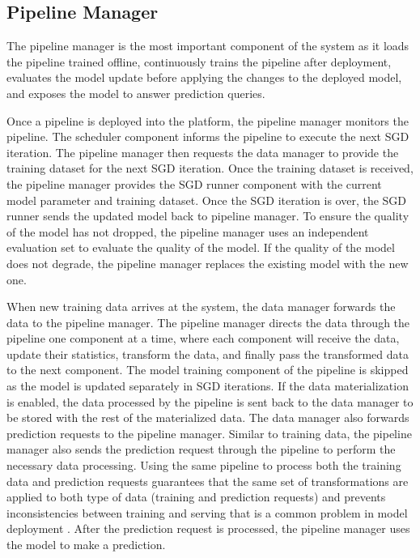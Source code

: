 \subsection{Pipeline Manager} \label{pipeline-manager} 
The pipeline manager is the most important component of the system as it loads the pipeline trained offline, continuously trains the pipeline after deployment, evaluates the model update before applying the changes to the deployed model, and exposes the model to answer prediction queries.

Once a pipeline is deployed into the platform, the pipeline manager monitors the pipeline.
The scheduler component informs the pipeline to execute the next SGD iteration.
The pipeline manager then requests the data manager to provide the training dataset for the next SGD iteration.
Once the training dataset is received, the pipeline manager provides the SGD runner component with the current model parameter and training dataset.
Once the SGD iteration is over, the SGD runner sends the updated model back to pipeline manager.
To ensure the quality of the model has not dropped, the pipeline manager uses an independent evaluation set to evaluate the quality of the model.
If the quality of the model does not degrade, the pipeline manager replaces the existing model with the new one.

When new training data arrives at the system, the data manager forwards the data to the pipeline manager. 
The pipeline manager directs the data through the pipeline one component at a time, where each component will receive the data, update their statistics, transform the data, and finally pass the transformed data to the next component.
The model training component of the pipeline is skipped as the model is updated separately in SGD iterations.
If the data materialization is enabled, the data processed by the pipeline is sent back to the data manager to be stored with the rest of the materialized data.
The data manager also forwards prediction requests to the pipeline manager.
Similar to training data, the pipeline manager also sends the prediction request through the pipeline to perform the necessary data processing.
Using the same pipeline to process both the training data and prediction requests guarantees that the same set of transformations are applied to both type of data (training and prediction requests) and prevents inconsistencies between training and serving that is a common problem in model deployment \cite{baylor2017tfx}.
After the prediction request is processed, the pipeline manager uses the model to make a prediction.

